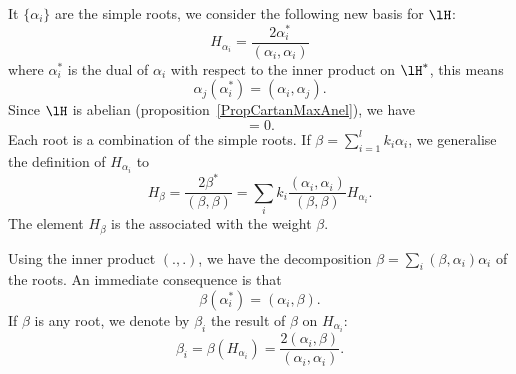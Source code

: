 It $\{ \alpha_i \}$ are the simple roots, we consider the following new basis for $\lH$:
\begin{equation}
	H_{\alpha_i}=\frac{ 2\alpha_i^* }{ (\alpha_i,\alpha_i) }
\end{equation}
where $\alpha_i^*$ is the dual of $\alpha_i$ with respect to the inner product on \( \lH^*\), this means
\begin{equation}
	\alpha_j(\alpha_i^*)=(\alpha_i,\alpha_j).
\end{equation}
Since \( \lH\) is abelian (proposition~\ref{PropCartanMaxAnel}), we have
\begin{equation}
	[H_{\alpha_i},H_{\alpha_j}]=0.
\end{equation}
Each root is a combination of the simple roots. If $\beta=\sum_{i=1}^lk_i\alpha_i$, we generalise the definition of $H_{\alpha_i}$ to
\begin{equation}
	H_{\beta}=\frac{ 2\beta^* }{ (\beta,\beta) }=\sum_i k_i\frac{ (\alpha_i,\alpha_i) }{ (\beta,\beta) }H_{\alpha_i}.
\end{equation}
The element $H_{\beta}$ is the  associated with the weight $\beta$.

Using the inner product $(.,.)$, we have the decomposition $\beta=\sum_i(\beta,\alpha_i)\alpha_i$ of the roots. An immediate consequence is that
\begin{equation}
	\beta(\alpha_i^*)=(\alpha_i,\beta).
\end{equation}
If $\beta$ is any root, we denote by $\beta_i$ the result of $\beta$ on $H_{\alpha_i}$:
\begin{equation}            \label{EqbetaialphaiH}
	\beta_i=\beta(H_{\alpha_i})=\frac{ 2(\alpha_i,\beta) }{ (\alpha_i,\alpha_i) }.
\end{equation}

